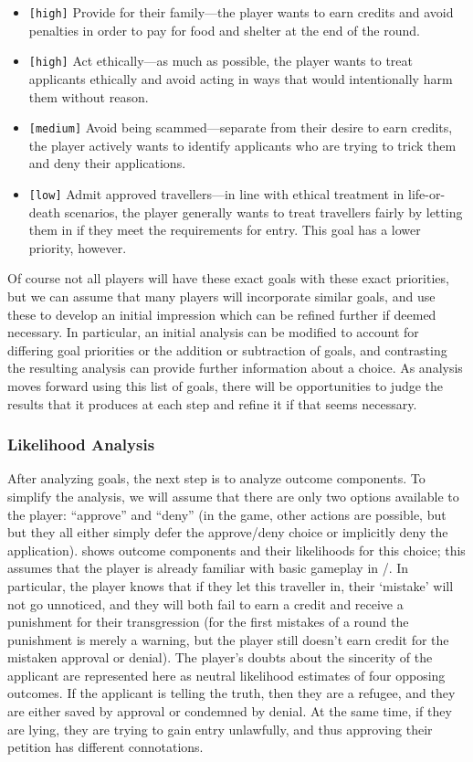 \begin{itemize}
  \item \texttt{[high]} Provide for their family---the player wants to earn credits and avoid penalties in order to pay for food and shelter at the end of the round.
  \item \texttt{[high]} Act ethically---as much as possible, the player wants to treat applicants ethically and avoid acting in ways that would intentionally harm them without reason.
  \item \texttt{[medium]} Avoid being scammed---separate from their desire to earn credits, the player actively wants to identify applicants who are trying to trick them and deny their applications.
  \item \texttt{[low]} Admit approved travellers---in line with ethical treatment in life-or-death scenarios, the player generally wants to treat travellers fairly by letting them in if they meet the requirements for entry. This goal has a lower priority, however.
\end{itemize}

Of course not all players will have these exact goals with these exact priorities, but we can assume that many players will incorporate similar goals, and use these to develop an initial impression which can be refined further if deemed necessary.
%
In particular, an initial analysis can be modified to account for differing goal priorities or the addition or subtraction of goals, and contrasting the resulting analysis can provide further information about a choice.
%
As analysis moves forward using this list of goals, there will be opportunities to judge the results that it produces at each step and refine it if that seems necessary.

\subsubsection{Likelihood Analysis}

After analyzing goals, the next step is to analyze outcome components.
%
To simplify the analysis, we will assume that there are only two options available to the player: ``approve'' and ``deny'' (in the game, other actions are possible, but but they all either simply defer the approve/deny choice or implicitly deny the application).
%
 shows outcome components and their likelihoods for this choice; this assumes that the player is already familiar with basic gameplay in \papersplease/.
%
In particular, the player knows that if they let this traveller in, their `mistake' will not go unnoticed, and they will both fail to earn a credit and receive a punishment for their transgression (for the first mistakes of a round the punishment is merely a warning, but the player still doesn't earn credit for the mistaken approval or denial).
%
The player's doubts about the sincerity of the applicant are represented here as neutral likelihood estimates of four opposing outcomes.
%
If the applicant is telling the truth, then they are a refugee, and they are either saved by approval or condemned by denial.
%
At the same time, if they are lying, they are trying to gain entry unlawfully, and thus approving their petition has different connotations.


